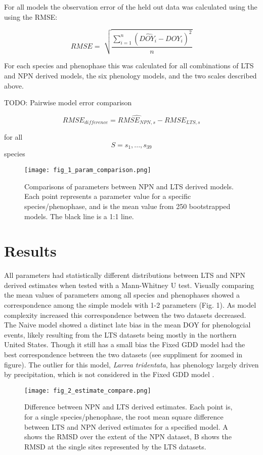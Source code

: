 \documentclass[fleqn,10pt,lineno]{wlpeerj} %
\begin{document}
For all models the observation error of the held out data was calculated using the using the RMSE:

$$ RMSE = \sqrt[]{ \frac{\sum_{i=1}^{n}(\widehat{DOY_{i}} - DOY_{i})^{2}}{n}} $$

For each species and phenophase this was calculated for all combinations of LTS and NPN derived models, the six phenology models, and the two scales described above. 

TODO: Pairwise model error comparison

$$ RMSE_{difference} = \widehat{RMSE_{NPN,s}} - RMSE_{LTS,s} $$

for all $$S = s_{1},...,s_{39}$$ species

\begin{figure}[]
	\centering
		\texttt{[image: fig\_1\_param\_comparison.png]}
	\caption{Comparisons of parameters between NPN and LTS derived models. Each point represents a parameter value for a specific species/phenophase, and is the mean value from 250 bootstrapped  models. The black line is a 1:1 line.}
\end{figure}


\section*{Results}

All parameters had statistically different distributions between LTS and NPN derived estimates when tested with a Mann-Whitney U test. Visually comparing the mean values of parameters among all species and phenophases showed a correspondence among the simple models with 1-2 parameters (Fig. 1). As model complexity increased this correspondence between the two datasets decreased. The Naive model showed a distinct late bias in the mean DOY for phenologcial events, likely resulting from the LTS datasets being mostly in the northern United States. Though it still has a small bias the Fixed GDD model had the best correspondence between the two datasets (see suppliment for zoomed in figure). The outlier for this model, \textit{Larrea tridentata}, has phenology largely driven by precipitation, which is not considered in the Fixed GDD model \citep{beatley1974}. 

\begin{figure}
	\centering
		\texttt{[image: fig\_2\_estimate\_compare.png]}
	\caption{Difference between NPN and LTS derived estimates. Each point is, for a single species/phenophase, the root mean square difference between LTS and NPN derived estimates for a specified model. A shows the RMSD over the extent of the NPN dataset, B shows the RMSD at the single sites represented by the LTS datasets.}
\end{figure}
\end{document}
